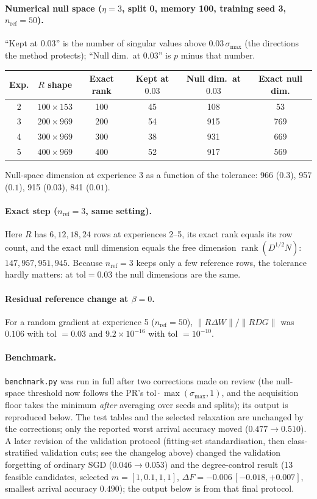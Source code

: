 \documentclass[11pt,a4paper]{article}
\newcommand{\code}[1]{\texttt{#1}}
\begin{document}
\paragraph{Numerical null space ($\eta=3$, split 0, memory 100, training seed 3, $n_{\text{ref}}=50$).} ``Kept at $0.03$'' is the number of singular values above $0.03\,\sigma_{\max}$ (the directions the method protects); ``Null dim.\ at $0.03$'' is $p$ minus that number.
\begin{center}
\begin{tabular}{@{}cccccc@{}}
\toprule
Exp. & $R$ shape & Exact rank & Kept at $0.03$ & Null dim.\ at $0.03$ & Exact null dim.\\
\midrule
2 & $100\times153$ & 100 & 45 & 108 & 53\\
3 & $200\times969$ & 200 & 54 & 915 & 769\\
4 & $300\times969$ & 300 & 38 & 931 & 669\\
5 & $400\times969$ & 400 & 52 & 917 & 569\\
\bottomrule
\end{tabular}
\end{center}
Null-space dimension at experience 3 as a function of the tolerance: 966 ($0.3$), 957 ($0.1$), 915 ($0.03$), 841 ($0.01$).

\paragraph{Exact step ($n_{\text{ref}}=3$, same setting).} Here $R$ has $6,12,18,24$ rows at experiences 2--5, its exact rank equals its row count, and the exact null dimension equals the free dimension $\operatorname{rank}(D^{1/2}N)$: $147,957,951,945$. Because $n_{\text{ref}}=3$ keeps only a few reference rows, the tolerance hardly matters: at $\text{tol}=0.03$ the null dimensions are the same.

\paragraph{Residual reference change at $\beta=0$.} For a random gradient at experience 5 ($n_{\text{ref}}=50$), $\|R\Delta W\|/\|RDG\|$ was $0.106$ with tol $=0.03$ and $9.2\times10^{-16}$ with tol $=10^{-10}$.

\paragraph{Benchmark.} \code{benchmark.py} was run in full after two corrections made on review (the null-space threshold now follows the PR's $\text{tol}\cdot\max(\sigma_{\max},1)$, and the acquisition floor takes the minimum \emph{after} averaging over seeds and splits); its output is reproduced below. The test tables and the selected relaxation are unchanged by the corrections; only the reported worst arrival accuracy moved ($0.477\to0.510$). A later revision of the validation protocol (fitting-set standardisation, then class-stratified validation cuts; see the changelog above) changed the validation forgetting of ordinary SGD ($0.046\to0.053$) and the degree-control result (13 feasible candidates, selected $m=[1,0.1,1,1]$, $\Delta F=-0.006\,[-0.018,+0.007]$, smallest arrival accuracy $0.490$); the output below is from that final protocol.
\end{document}
